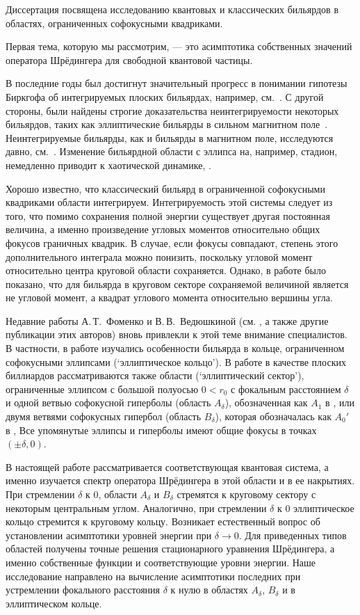 
{\actuality} 
Диссертация посвящена исследованию квантовых и классических бильярдов в областях, ограниченных софокусными квадриками.

Первая тема, которую мы рассмотрим, --- это асимптотика собственных значений оператора Шрёдингера для свободной квантовой частицы. 

В последние годы был достигнут значительный прогресс в понимании гипотезы Биркгофа об интегрируемых плоских бильярдах, например, см.~\cite{bm2022}.
С другой стороны, были найдены строгие доказательства неинтегрируемости некоторых бильярдов, таких как эллиптические бильярды в сильном магнитном поле~\cite{bm2020, bm2019}. Неинтегрируемые бильярды, как и бильярды в магнитном поле, исследуются давно, см.~\cite{berry1985, berry1986}.
Изменение бильярдной области с эллипса на, например, стадион, немедленно приводит к хаотической динамике, \cite{bunimovich1974, stockmann2000}.

Хорошо известно, что классический бильярд в ограниченной софокусными квадриками области интегрируем. Интегрируемость  этой системы следует из того, что помимо сохранения полной энергии существует другая постоянная величина, а именно произведение угловых моментов относительно общих фокусов граничных квадрик.
В случае, если фокусы совпадают, степень этого дополнительного интеграла можно понизить, поскольку угловой момент относительно центра круговой области сохраняется.
Однако, в работе \cite{wref13} было показано, что для бильярда в круговом секторе сохраняемой величиной является не  угловой момент, а квадрат углового момента относительно вершины угла.


Недавние работы А.\,Т.~Фоменко и В.\,В.~Ведюшкиной (см. \cite{wref6,wref7,wref8} , а также другие публикации этих авторов) вновь привлекли к этой теме внимание специалистов. 
В частности, в работе \cite{wref6} изучались особенности бильярда в кольце, ограниченном софокусными эллипсами (`эллиптическое кольцо'). 
В работе \cite{Fok15} в качестве плоских биллиардов рассматриваются также области (`эллиптический сектор'), ограниченные эллипсом с большой полуосью $0 <r_0$ с фокальным расстоянием $\delta$ и 
одной ветвью софокусной гиперболы  (область $A_\delta$), обозначенная как  $A_1$ в \cite{Fok15},
или двумя ветвями софокусных гипербол (область $B_\delta$), которая обозначалась как  $A_0'$ в \cite{Fok15},
Все упомянутые эллипсы и гиперболы имеют общие фокусы в точках $(\pm \delta, 0)$.

В настоящей работе рассматривается соответствующая квантовая система, а именно изучается спектр оператора Шрёдингера в этой области и в ее накрытиях. 
При стремлении $\delta$ к $0$, области $A_\delta$ и $B_\delta$  стремятся к круговому сектору с некоторым центральным углом. Аналогично, при стремлении $\delta$ к $0$ эллиптическое кольцо стремится к круговому кольцу. 
Возникает естественный вопрос об установлении асимптотики уровней энергии при $\delta \to 0$. 
Для приведенных типов областей получены точные решения стационарного уравнения Шрёдингера, а именно собственные функции и соответствующие уровни энергии. Наше исследование направлено на вычисление асимптотики последних при устремлении фокального расстояния $\delta$ к нулю в областях $A_\delta$, $B_\delta$ и в эллиптическом кольце.

